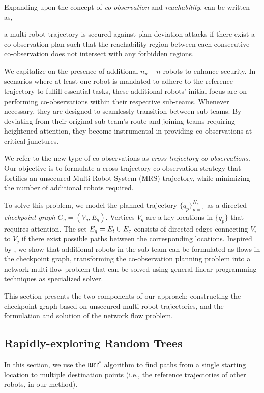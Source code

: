 \documentclass[journal]{IEEEtran}  %
\newcommand{\rrtstar}{$\texttt{RRT}^\texttt{*}$}
\begin{document}
Expanding upon the concept of \emph{co-observation} and \emph{reachability},  can be written as,
\begin{remark}\label{rmk:revised-security}
  a multi-robot trajectory is secured against plan-deviation attacks if there exist a co-observation plan such that the reachability region between each consecutive co-observation does not intersect with any forbidden regions.
\end{remark}

We capitalize on the presence of additional $n_p-n$ robots to enhance security.
In scenarios where at least one robot is mandated to adhere to the reference trajectory to fulfill essential tasks, these additional robots' initial focus are on performing co-observations within their respective sub-teams. Whenever necessary, they are designed to seamlessly transition between sub-teams. By deviating from their original sub-team's route and joining teams requiring heightened attention, they become instrumental in providing co-observations at critical junctures. 

We refer to the new type of co-observations as \emph{cross-trajectory co-observations}. Our objective is to formulate a cross-trajectory co-observation strategy that fortifies an unsecured Multi-Robot System (MRS) trajectory, while minimizing the number of additional robots required.

To solve this problem, we model the planned trajectory $\{q_p\}_{p=1}^{N_p}$ as a directed \emph{checkpoint graph} $G_{q}=(V_{q}, E_{q})$. 
Vertices $V_{q}$ are a key locations in $\{q_p\}$ that requires attention.
The set $E_{q} = E_{t} \cup E_{c}$ consists of directed edges connecting $V_i$ to $V_j$ if there exist possible paths between the corresponding locations.  Inspired by \cite{yu2013multi}, we show that additional robots in the sub-team can be formulated as flows in the checkpoint graph, transforming the co-observation planning problem into a network multi-flow problem that can be solved using general linear programming techniques as specialized solver. 

This section presents the two components of our approach: constructing the checkpoint graph based on unsecured multi-robot trajectories, and the formulation and solution of the network flow problem.

\subsection{Rapidly-exploring Random Trees}
In this section, we use the \rrtstar{} \cite{karaman2010incremental} algorithm to find paths from a single starting location to multiple destination points (i.e., the reference trajectories of other robots, in our method). 
\end{document}
